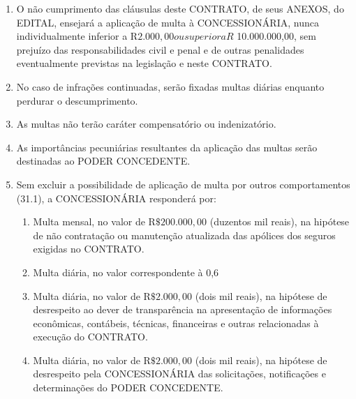 \documentclass[a4paper,11pt]{report} %
\begin{document}
\begin{enumerate}
\item \label{itm:JXXF} O não cumprimento das cláusulas deste CONTRATO, de seus ANEXOS, do EDITAL, ensejará a aplicação de multa à CONCESSIONÁRIA, nunca individualmente inferior a R$ 2.000,00 ou superior a R$ 10.000.000,00, sem prejuízo das responsabilidades civil e penal e de outras penalidades eventualmente previstas na legislação e neste CONTRATO. 

\item \label{itm:FKHY} No caso de infrações continuadas, serão fixadas multas diárias enquanto perdurar o descumprimento.

\item \label{itm:76MX} As multas não terão caráter compensatório ou indenizatório.

\item \label{itm:7TQZ} As importâncias pecuniárias resultantes da aplicação das multas serão destinadas ao PODER CONCEDENTE. 

\item \label{itm:M6RE} Sem excluir a possibilidade de aplicação de multa por outros comportamentos (31.1), a CONCESSIONÁRIA responderá por:

\begin{enumerate}[label*=\arabic*.]
\item \label{itm:PXN6} Multa mensal, no valor de R$\$ 200.000,00$ (duzentos mil reais), na hipótese de não contratação ou manutenção atualizada das apólices dos seguros exigidas no CONTRATO.

\item \label{itm:YP63} Multa diária, no valor correspondente à 0,6%

\item \label{itm:3F6F} Multa diária, no valor de R$\$ 2.000,00$ (dois mil reais), na hipótese de desrespeito ao dever de transparência na apresentação de informações econômicas, contábeis, técnicas, financeiras e outras relacionadas à execução do CONTRATO.

\item \label{itm:8A3F} Multa diária, no valor de R$\$ 2.000,00$ (dois mil reais), na hipótese de desrespeito pela CONCESSIONÁRIA das solicitações, notificações e determinações do PODER CONCEDENTE.


\end{enumerate}
\end{enumerate}
\end{document}
